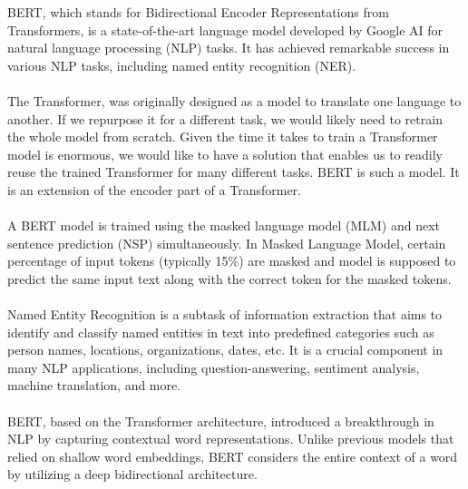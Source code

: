 BERT, which stands for Bidirectional Encoder Representations from Transformers, is a state-of-the-art language model developed by Google AI for natural language processing (NLP) tasks. It has achieved remarkable success in various NLP tasks, including named entity recognition (NER).\\
\\
The Transformer, was originally designed as a model to translate one language to another. If we repurpose it for a different task, we would likely need to retrain the whole model from scratch. Given the time it takes to train a Transformer model is enormous, we would like to have a solution that enables us to readily reuse the trained Transformer for many different tasks. BERT is such a model. It is an extension of the encoder part of a Transformer.\\
\\
A BERT model is trained using the masked language model (MLM) and next sentence prediction (NSP) simultaneously. In Masked Language Model, certain percentage of input tokens (typically 15\%) are masked and model is supposed to predict the same input text along with the correct token for the masked tokens.\\
\\
Named Entity Recognition is a subtask of information extraction that aims to identify and classify named entities in text into predefined categories such as person names, locations, organizations, dates, etc. It is a crucial component in many NLP applications, including question-answering, sentiment analysis, machine translation, and more.\\
\\
BERT, based on the Transformer architecture, introduced a breakthrough in NLP by capturing contextual word representations. Unlike previous models that relied on shallow word embeddings, BERT considers the entire context of a word by utilizing a deep bidirectional architecture.\cite{BERT}

